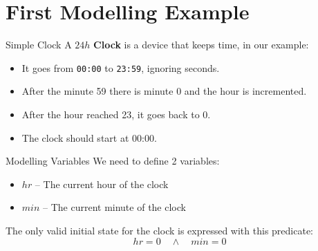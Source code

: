 \section[image=clock_col]{First Modelling Example}
\begin{frame}[plain]{}
    \sectionpage
\end{frame}

\begin{frame}{Simple Clock}
    A $24h$ \textbf{Clock} is a device that keeps time, in our example:
    \begin{itemize}
        \item<1-> It goes from \texttt{00:00} to \texttt{23:59}, ignoring seconds.
        \item<2-> After the minute 59 there is minute 0 and the hour is incremented.
        \item<2-> After the hour reached 23, it goes back to 0.
        \item<3-> The clock should start at 00:00.
    \end{itemize}
\end{frame}

\begin{frame}{Modelling Variables}
    We need to define 2 variables:
    \begin{itemize}[<+->]
        \item $hr$ -- The current hour of the clock
        \item $min$ -- The current minute of the clock\demo
    \end{itemize}
    \onslide<+->
    \vspace{1cm}
    The only valid initial state for the clock is expressed with this predicate:
    \[
        hr = 0 \quad \land \quad min = 0
    \]
    \demo
\end{frame}

